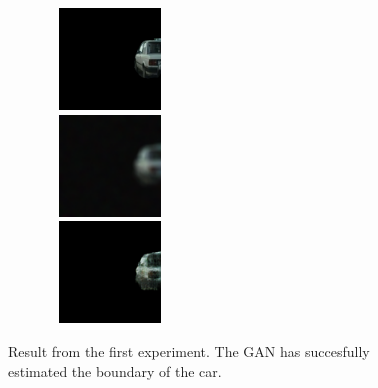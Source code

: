 %
%	

\begin{figure}
	\centering
	\includegraphics[width=5.4cm, height=2.7cm]{./figure/126_real_B}\\
	\includegraphics[width=5.4cm, height=2.7cm]{./figure/126_real_A}\\
	\includegraphics[width=5.4cm, height=2.7cm]{./figure/126_fake_B}\\
	\caption{Result from the first experiment. The GAN has succesfully estimated the boundary of the car.}\label{fig1}
\end{figure}


